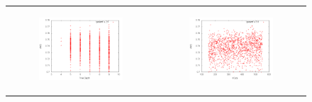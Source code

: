 \begin{figure}[!t]
  \begin{tabular}[b]{cc}
	  \begin{subfigure}[b]{0.5\linewidth}
	   	\includegraphics[width=\linewidth]{sections/parameter_optimization_bdt/Depth.png}
 		\caption[]{}
		\label{fig:bdt_Depth}
  	  \end{subfigure} &
  	  \begin{subfigure}[b]{0.5\linewidth}
  	  	\includegraphics[width=\linewidth]{sections/parameter_optimization_bdt/nCuts.png}
 		\caption[]{}
		\label{fig:bdt_nCuts}
  	  \end{subfigure} \\
  	  

\end{tabular}
\end{figure}

